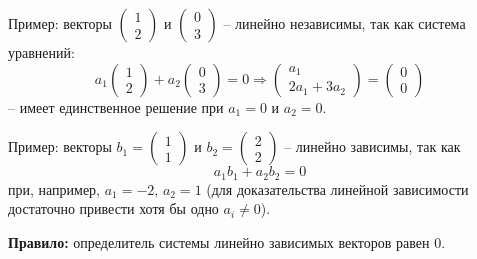 \documentclass[11pt, a4paper]{extarticle}
\begin{document}
Пример: векторы $\begin{pmatrix}
1 \\
2
\end{pmatrix}$ и $\begin{pmatrix}
0 \\
3
\end{pmatrix}$ – линейно независимы, так как система уравнений:
\[
a_1\begin{pmatrix}
1 \\
2
\end{pmatrix} + a_2\begin{pmatrix}
0 \\
3
\end{pmatrix} = 0 \Rightarrow \begin{pmatrix}
a_1 \\
2a_1 + 3a_2
\end{pmatrix} = \begin{pmatrix}
0 \\
0
\end{pmatrix}
\]
– имеет единственное решение при $a_1 = 0$ и $a_2 = 0$.

Пример: векторы $b_1 = \begin{pmatrix}
1 \\
1
\end{pmatrix}$ и $b_2 = \begin{pmatrix}
2 \\
2
\end{pmatrix}$ – линейно зависимы, так как
\[
a_1b_1 + a_2b_2 = 0
\]
при, например, $a_1 = -2$, $a_2 = 1$ (для доказательства линейной зависимости достаточно привести хотя бы одно $a_i \ne 0$).

\textbf{Правило:} определитель системы линейно зависимых векторов равен 0.
\end{document}
